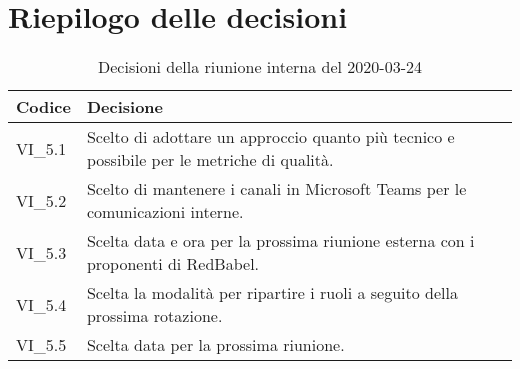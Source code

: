 \section{Riepilogo delle decisioni}
\begin{longtable}{ 
	 >{\centering}p{} >{}p{} }
	
	\caption{Decisioni della riunione interna del 2020-03-24}\\	
	
	\textbf{\color{white}Codice} & 
	\textbf{\color{white}Decisione} 
	\tabularnewline  
	\endhead
	
	VI\_5.1 & Scelto di adottare un approccio quanto più tecnico e possibile per le metriche di qualità. \\
	VI\_5.2 & Scelto di mantenere i canali in Microsoft Teams per le comunicazioni interne. \\
	VI\_5.3 & Scelta data e ora per la prossima riunione esterna con i proponenti di RedBabel. \\
	VI\_5.4 & Scelta la modalità per ripartire i ruoli a seguito della prossima rotazione. \\
	VI\_5.5 & Scelta data per la prossima riunione. \\
	
\end{longtable}